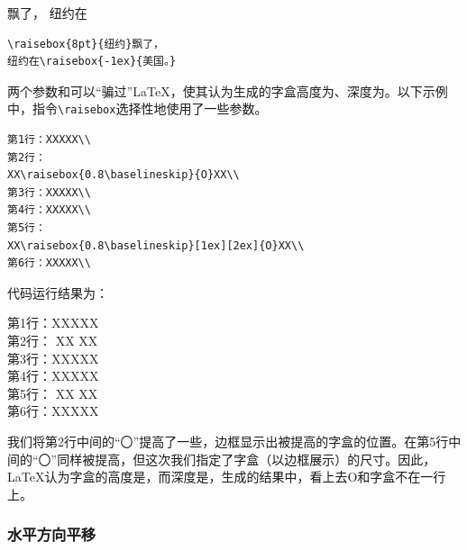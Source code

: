 \begin{codelist}[4.12]{
飘了，
纽约在
}\begin{verbatim}
\raisebox{8pt}{纽约}飘了，
纽约在\raisebox{-1ex}{美国。}
\end{verbatim}
\end{codelist}

两个参数和可以“骗过”\LaTeX ，使其认为生成的字盒高度为、深度为。以下示例中，指令\verb|\raisebox|选择性地使用了一些参数。

\begin{dmd}
  \begin{verbatim}
第1行：XXXXX\\
第2行：
XX\raisebox{0.8\baselineskip}{O}XX\\
第3行：XXXXX\\
第4行：XXXXX\\
第5行：
XX\raisebox{0.8\baselineskip}[1ex][2ex]{O}XX\\ 
第6行：XXXXX\\
  \end{verbatim}
\end{dmd}

代码运行结果为：

\newcommand{\blob}{\makebox[\tmplength]{O}}

\begin{flushleft}
  第1行：XXXXX\\
  第2行：
  XX\hspace{-\fboxrule}%
  \fbox{\raisebox{0.8\baselineskip}{\blob}}%
  \hspace{-\fboxrule}XX \\
  第3行：XXXXX\\
  第4行：XXXXX\\
  第5行：
  XX\hspace{-\fboxrule}%
  \fbox{\raisebox{0.8\baselineskip}[1ex][2ex]{\blob}}%
  \hspace{-\fboxrule}XX \\
  第6行：XXXXX\\
\end{flushleft}

我们将第2行中间的“〇”提高了一些，边框显示出被提高的字盒的位置。在第5行中间的“〇”同样被提高，但这次我们指定了字盒（以边框展示）的尺寸。因此，\LaTeX 认为字盒的高度是\dm{1ex}，而深度是\dm{2ex}，生成的结果中，看上去O和字盒不在一行上。

\subsubsection{水平方向平移}

